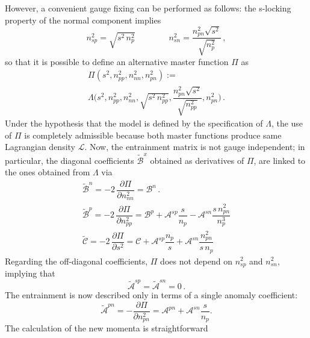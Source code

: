 \documentclass[usenatbib]{mnras}
\begin{document}
However, a convenient gauge fixing can be performed as follows: the s-locking property of the normal component implies  
%
\begin{equation}
n_{sp}^2 = \sqrt{s^2 \, n_p^2} 
\qquad
\qquad
n_{sn}^2 = \dfrac{n_{pn}^2 \sqrt{s^2}}{\sqrt{n_p^2}} \, , 
\end{equation}
%
so that it is possible to define an alternative master function $\Pi$ as
%
\begin{multline}
\Pi(s^2, n_{pp}^2, n_{nn}^2 , n_{pn}^2 ) 
:= \\
\Lambda \bigg( s^2, n_{pp}^2, n_{nn}^2 ,  \sqrt{s^2 \, n_{pp}^2} , \dfrac{n_{pn}^2 \sqrt{s^2}}{\sqrt{n_{pp}^2}}, n_{pn}^2 \bigg) \, .
\end{multline}
%
Under the hypothesis that the model is defined by the specification of $\Lambda$, the use of $\Pi$ is completely admissible because both master functions produce same Lagrangian density $\mathcal{L}$. Now, the entrainment matrix is not gauge independent; in particular, the diagonal coefficients $\tilde{\mathcal{B}}^x$ obtained as derivatives of $\Pi$, are linked to the ones obtained from $\Lambda$ via
%
\begin{equation} 
\label{coefficientigaugiati}
\begin{array}{l}

\tilde{\mathcal{B}}^n =
-2 \, \dfrac{\partial \Pi}{\partial n_{nn}^2} 
= \mathcal{B}^n \, .
\\
\tilde{\mathcal{B}}^p =
-2 \, \dfrac{\partial \Pi}{\partial n_{pp}^2} 
= \mathcal{B}^p + \mathcal{A}^{sp} \dfrac{s}{n_p} - \mathcal{A}^{sn} \dfrac{s \, n_{pn}^2} {n_p^3} 
\\
\tilde{\mathcal{C}}= 
-2 \, \dfrac{\partial \Pi}{\partial s^2} 
= \mathcal{C} + \mathcal{A}^{sp} \dfrac{n_p}{s} + \mathcal{A}^{sn} \dfrac{n_{pn}^2}{s \, n_p} 
\end{array}
\end{equation}
%
Regarding the off-diagonal coefficients, $\Pi$ does not depend on $n_{sp}^2$ and $n_{sn}^2$, implying that 
%
\begin{equation}
\tilde{\mathcal{A}}^{sp} = \tilde{\mathcal{A}}^{sn}=0 \,. 
\end{equation}
%
The entrainment is now described only in terms of a single anomaly coefficient:
%
\begin{equation}
\tilde{\mathcal{A}}^{pn}= -\dfrac{\partial \Pi}{\partial n_{pn}^2} = \mathcal{A}^{pn} + \mathcal{A}^{sn} \dfrac{s}{n_p}.
\end{equation}
%
The calculation of the new momenta is straightforward
\end{document}
